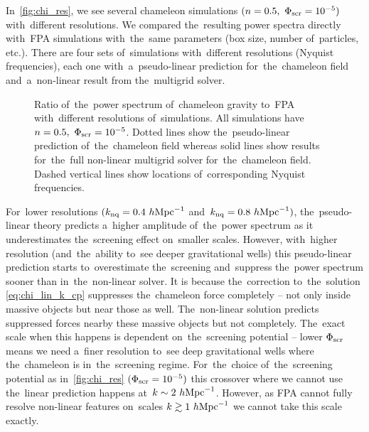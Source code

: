 In~\autoref{fig:chi_res}, we see several chameleon simulations $(n=0.5,\ \Phi_{\text{\scriptsize scr}}=10^{-5})$ with~different resolutions. We compared the~resulting power spectra directly with~FPA simulations with~the~same parameters (box size, number of~particles, etc.). There are four sets of~simulations with~different resolutions (Nyquist frequencies), each one with~a~pseudo-linear prediction for~the~chameleon field and~a~non-linear result from the~multigrid solver.

\begin{figure}[bt]
	\centering
	  \begin{subfigure}{0.85\textwidth}
	  \end{subfigure}
	  \begin{subfigure}{0.85\textwidth}
	  \end{subfigure}
	\caption{Ratio of~the~power spectrum of~chameleon gravity to~FPA with~different resolutions of~simulations. All simulations have $n=0.5,\ \Phi_{\text{\scriptsize scr}}=10^{-5}$. Dotted lines show the~pseudo-linear prediction of~the~chameleon field whereas solid lines show results for~the~full non-linear multigrid solver for~the~chameleon field. Dashed vertical lines show locations of~corresponding Nyquist frequencies.}
	\label{fig:chi_res}
\end{figure}
For~lower resolutions $(k_{\rm nq} = 0.4~h\text{Mpc}^{-1}$ and~$k_{\rm nq} = 0.8~h\text{Mpc}^{-1})$, the~pseudo-linear theory predicts a~higher amplitude of~the~power spectrum as it underestimates the~screening effect on~smaller scales. However, with~higher resolution (and~the~ability to~see deeper gravitational wells) this pseudo-linear prediction starts to~overestimate the~screening and~suppress the~power spectrum sooner than in~the~non-linear solver. It is because the~correction to~the~solution \eqref{eq:chi_lin_k_cp} suppresses the~chameleon force completely -- not only inside massive objects but near those as well. The~non-linear solution predicts suppressed forces nearby these massive objects but not completely. The~exact scale when this happens is dependent on~the~screening potential -- lower $\Phi_{\text{\scriptsize scr}}$ means we need a~finer resolution to~see deep gravitational wells where the~chameleon is in~the~screening regime. For~the~choice of~the~screening potential as in~\autoref{fig:chi_res} $(\Phi_{\text{\scriptsize scr}}=10^{-5})$ this crossover where we cannot use the~linear prediction happens at~$k\sim2~h\text{Mpc}^{-1}$. However, as FPA cannot fully resolve non-linear features on~scales $k\gtrsim1~h\text{Mpc}^{-1}$  we cannot take this scale exactly.

